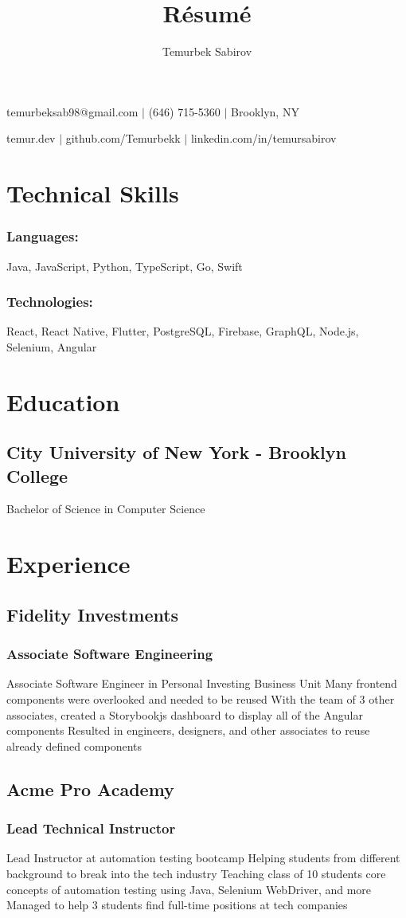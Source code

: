 \documentclass{article}
\makeatletter
\renewcommand{\maketitle}{
\begin{center}
{\huge\bfseries    
\theauthor}

temurbeksab98@gmail.com $|$ (646) 715-5360 $|$ Brooklyn, NY

temur.dev $|$ github.com/Temurbekk $|$ linkedin.com/in/temursabirov 
\end{center}
    
    }
\makeatother
\begin{document}
\title{R\'esum\'e}
\author{Temurbek Sabirov}

\maketitle

\section{Technical Skills}
\subsubsection{Languages:}
Java, JavaScript, Python, TypeScript, Go, Swift
\subsubsection{Technologies:}
React, React Native, Flutter, PostgreSQL, Firebase, GraphQL, Node.js, Selenium, Angular
\section{Education}
\subsection{City University of New York - Brooklyn College}
Bachelor of Science in Computer Science
\section{Experience}
\subsection{Fidelity Investments}
\subsubsection{Associate Software Engineering}
Associate Software Engineer in Personal Investing Business Unit
Many frontend components were overlooked and needed to be reused
With the team of 3 other associates, created a Storybookjs dashboard to display all of the Angular components
Resulted in engineers, designers, and other associates to reuse already defined components
\subsection{Acme Pro Academy}
\subsubsection{Lead Technical Instructor}
Lead Instructor at automation testing bootcamp
Helping students from different background to break into the tech industry
Teaching class of 10 students core concepts of automation testing using Java, Selenium WebDriver, and more
Managed to help 3 students find full-time positions at tech companies
\end{document}
